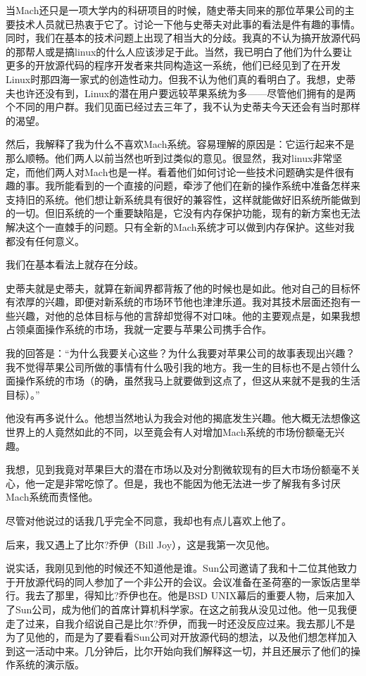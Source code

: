 当Mach还只是一项大学内的科研项目的时候，随史蒂夫同来的那位苹果公司的主要技术人员就已热衷于它了。讨论一下他与史蒂夫对此事的看法是件有趣的事情。同时，我们在基本的技术问题上出现了相当大的分歧。我真的不认为搞开放源代码的那帮人或是搞linux的什么人应该涉足于此。当然，我已明白了他们为什么要让更多的开放源代码的程序开发者来共同构造这一系统，他们已经见到了在开发Linux时那四海一家式的创造性动力。但我不认为他们真的看明白了。我想，史蒂夫也许还没有到，Linux的潜在用户要远较苹果系统为多——尽管他们拥有的是两个不同的用户群。我们见面已经过去三年了，我不认为史蒂夫今天还会有当时那样的渴望。

然后，我解释了我为什么不喜欢Mach系统。容易理解的原因是：它运行起来不是那么顺畅。他们两人以前当然也听到过类似的意见。很显然，我对linux非常坚定，而他们两人对Mach也是一样。看着他们如何讨论一些技术问题确实是件很有趣的事。我所能看到的一个直接的问题，牵涉了他们在新的操作系统中准备怎样来支持旧的系统。他们想让新系统具有很好的兼容性，这样就能做好旧系统所能做到的一切。但旧系统的一个重要缺陷是，它没有内存保护功能，现有的新方案也无法解决这个一直棘手的问题。只有全新的Mach系统才可以做到内存保护。这些对我都没有任何意义。

我们在基本看法上就存在分歧。

史蒂夫就是史蒂夫，就算在新闻界都背叛了他的时候也是如此。他对自己的目标怀有浓厚的兴趣，即便对新系统的市场环节他也津津乐道。我对其技术层面还抱有一些兴趣，对他的总体目标与他的言辞却觉得不对口味。他的主要观点是，如果我想占领桌面操作系统的市场，我就一定要与苹果公司携手合作。

我的回答是：“为什么我要关心这些？为什么我要对苹果公司的故事表现出兴趣？我不觉得苹果公司所做的事情有什么吸引我的地方。我一生的目标也不是占领什么面操作系统的市场（的确，虽然我马上就要做到这点了，但这从来就不是我的生活目标）。”

他没有再多说什么。他想当然地认为我会对他的揭底发生兴趣。他大概无法想像这世界上的人竟然如此的不同，以至竟会有人对增加Mach系统的市场份额毫无兴趣。

我想，见到我竟对苹果巨大的潜在市场以及对分割微软现有的巨大市场份额毫不关心，他一定是非常吃惊了。但是，我也不能因为他无法进一步了解我有多讨厌Mach系统而责怪他。

尽管对他说过的话我几乎完全不同意，我却也有点儿喜欢上他了。

后来，我又遇上了比尔?乔伊（Bill Joy），这是我第一次见他。

说实话，我刚见到他的时候还不知道他是谁。Sun公司邀请了我和十二位其他致力于开放源代码的同人参加了一个非公开的会议。会议准备在圣荷塞的一家饭店里举行。我去了那里，得知比?乔伊也在。他是BSD UNIX幕后的重要人物，后来加入了Sun公司，成为他们的首席计算机科学家。在这之前我从没见过他。他一见我便走了过来，自我介绍说自己是比尔?乔伊，而我一时还没反应过来。我去那儿不是为了见他的，而是为了要看看Sun公司对开放源代码的想法，以及他们想怎样加入到这一活动中来。几分钟后，比尔开始向我们解释这一切，并且还展示了他们的操作系统的演示版。

